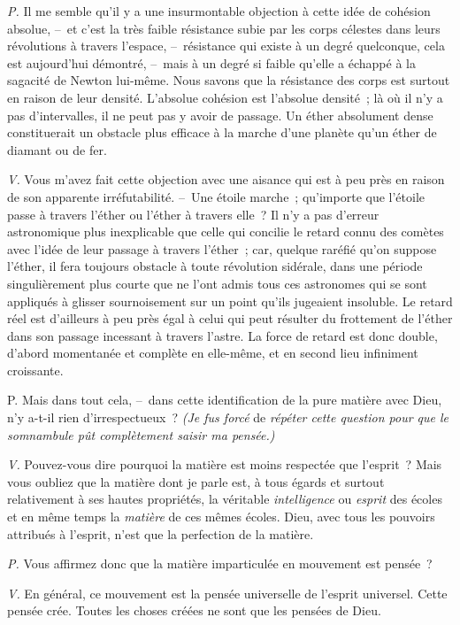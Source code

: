 \documentclass[french,twoside]{book} %
\begin{document}
\emph{P.} Il me semble qu’il y a une insurmontable objection à cette idée de cohésion absolue, – et c’est la très faible résistance subie par les corps célestes dans leurs révolutions à travers l’espace, – résistance qui existe à un degré quelconque, cela est aujourd’hui démontré, – mais à un degré si faible qu’elle a échappé à la sagacité de Newton lui-même. Nous savons que la résistance des corps est surtout en raison de leur densité. L’absolue cohésion est l’absolue densité ; là où il n’y a pas d’intervalles, il ne peut pas y avoir de passage. Un éther absolument dense constituerait un obstacle plus efficace à la marche d’une planète qu’un éther de diamant ou de fer.\par
\emph{V.} Vous m’avez fait cette objection avec une aisance qui est à peu près en raison de son apparente irréfutabilité. – Une étoile marche ; qu’importe que l’étoile passe à travers l’éther ou l’éther à travers elle ? Il n’y a pas d’erreur astronomique plus inexplicable que celle qui concilie le retard connu des comètes avec l’idée de leur passage à travers l’éther ; car, quelque raréfié qu’on suppose l’éther, il fera toujours obstacle à toute révolution sidérale, dans une période singulièrement plus courte que ne l’ont admis tous ces astronomes qui se sont appliqués à glisser sournoisement sur un point qu’ils jugeaient insoluble. Le retard réel est d’ailleurs à peu près égal à celui qui peut résulter du frottement de l’éther dans son passage incessant à travers l’astre. La force de retard est donc double, d’abord momentanée et complète en elle-même, et en second lieu infiniment croissante.\par
P. Mais dans tout cela, – dans cette identification de la pure matière avec Dieu, n’y a-t-il rien d’irrespectueux ? \emph{(Je fus forcé} de \emph{répéter cette question pour que le somnambule pût complètement saisir ma pensée.)}\par
\emph{V.} Pouvez-vous dire pourquoi la matière est moins respectée que l’esprit ? Mais vous oubliez que la matière dont je parle est, à tous égards et surtout relativement à ses hautes propriétés, la véritable \emph{intelligence} ou \emph{esprit} des écoles et en même temps la \emph{matière} de ces mêmes écoles. Dieu, avec tous les pouvoirs attribués à l’esprit, n’est que la perfection de la matière.\par
\emph{P.} Vous affirmez donc que la matière imparticulée en mouvement est pensée ?\par
\emph{V.} En général, ce mouvement est la pensée universelle de l’esprit universel. Cette pensée crée. Toutes les choses créées ne sont que les pensées de Dieu.\par
\end{document}
